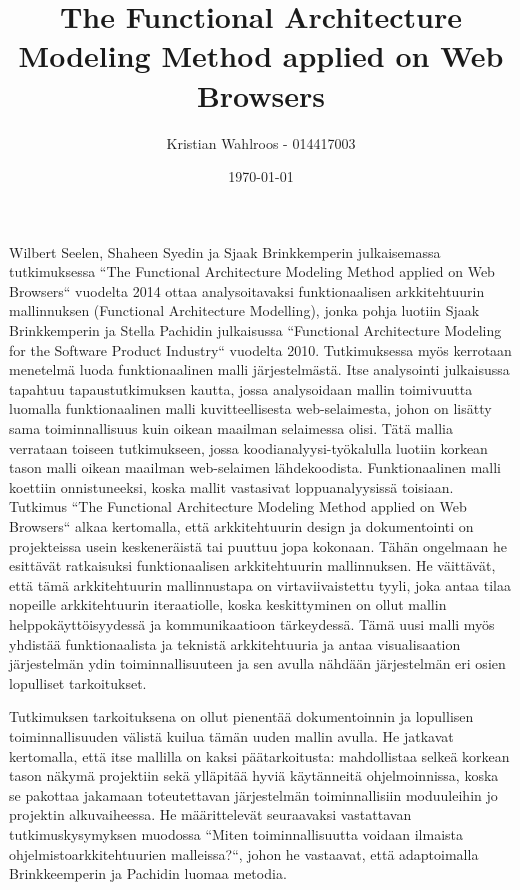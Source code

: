 \documentclass[finnish]{tktltiki2}
\title{The Functional Architecture Modeling Method applied on Web Browsers}
\author{Kristian Wahlroos - 014417003}
\date{\today}
\theoremstyle{definition}
\theoremstyle{remark}
\begin{document}

\frontmatter      %

\maketitle        %



\mainmatter       %


Wilbert Seelen, Shaheen Syedin ja Sjaak Brinkkemperin julkaisemassa tutkimuksessa ``The Functional Architecture Modeling Method applied on Web Browsers`` vuodelta 2014 ottaa analysoitavaksi funktionaalisen arkkitehtuurin mallinnuksen (Functional Architecture Modelling), jonka pohja luotiin Sjaak Brinkkemperin ja Stella Pachidin julkaisussa ``Functional Architecture Modeling for the Software Product Industry`` vuodelta 2010. Tutkimuksessa myös kerrotaan menetelmä luoda funktionaalinen malli järjestelmästä. Itse analysointi julkaisussa tapahtuu tapaustutkimuksen kautta, jossa analysoidaan mallin toimivuutta luomalla funktionaalinen malli kuvitteellisesta web-selaimesta, johon on lisätty sama toiminnallisuus kuin oikean maailman selaimessa olisi. Tätä mallia verrataan toiseen tutkimukseen, jossa koodianalyysi-työkalulla luotiin korkean tason malli oikean maailman web-selaimen lähdekoodista. Funktionaalinen malli koettiin onnistuneeksi, koska mallit vastasivat loppuanalyysissä toisiaan.\\

Tutkimus ``The Functional Architecture Modeling Method applied on Web Browsers`` alkaa kertomalla, että arkkitehtuurin design ja dokumentointi on projekteissa usein keskeneräistä tai puuttuu jopa kokonaan. Tähän ongelmaan he esittävät ratkaisuksi funktionaalisen arkkitehtuurin mallinnuksen. He väittävät, että tämä arkkitehtuurin mallinnustapa on virtaviivaistettu tyyli, joka antaa tilaa nopeille arkkitehtuurin iteraatiolle, koska keskittyminen on ollut mallin helppokäyttöisyydessä ja kommunikaatioon tärkeydessä. Tämä uusi malli myös yhdistää funktionaalista ja teknistä arkkitehtuuria ja antaa visualisaation järjestelmän ydin toiminnallisuuteen ja sen avulla nähdään järjestelmän eri osien lopulliset tarkoitukset.  

Tutkimuksen tarkoituksena on ollut pienentää dokumentoinnin ja lopullisen toiminnallisuuden välistä kuilua tämän uuden mallin avulla. He jatkavat kertomalla, että itse mallilla on kaksi päätarkoitusta: mahdollistaa selkeä korkean tason näkymä projektiin sekä ylläpitää hyviä käytänneitä ohjelmoinnissa, koska se pakottaa jakamaan toteutettavan järjestelmän toiminnallisiin moduuleihin jo projektin alkuvaiheessa. He määrittelevät seuraavaksi vastattavan tutkimuskysymyksen muodossa ``Miten toiminnallisuutta voidaan ilmaista ohjelmistoarkkitehtuurien malleissa?``, johon he vastaavat, että adaptoimalla Brinkkeemperin ja Pachidin luomaa metodia. 
\end{document}
